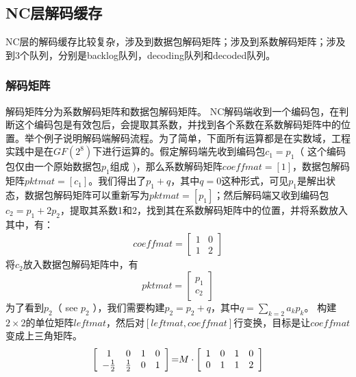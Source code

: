 \subsection{NC层解码缓存}
NC层的解码缓存比较复杂，涉及到数据包解码矩阵；涉及到系数解码矩阵；涉及到3个队列，分别是backlog队列，decoding队列和decoded队列。
\subsubsection{\textbf{解码矩阵}}
解码矩阵分为系数解码矩阵和数据包解码矩阵。
NC解码端收到一个编码包，在判断这个编码包是有效包后，会提取其系数，并找到各个系数在系数解码矩阵中的位置。举个例子说明解码端解码流程。为了简单，下面所有运算都是在实数域，工程实践中是在$GF\left(2^8\right)$下进行运算的。假定解码端先收到编码包$c_{1}=p_{1}$（ 这个编码包仅由一个原始数据包$p_{1}$组成 )，那么系数解码矩阵$coeffmat=\left[1\right]$，数据包解码矩阵$pktmat=\left[c_1\right]$。我们得出了$p_{1}+q$，其中$q=0$这种形式，可见$p_{1}$是解出状态，数据包解码矩阵可以重新写为$pktmat=\left[p_{1}\right]$；然后解码端又收到编码包$c_{2}=p_{1}+2p_{2}$，提取其系数1和2，找到其在系数解码矩阵中的位置，并将系数放入其中，有：
\begin{eqnarray}\label{eq31}
	coeffmat=\left[ {\begin{array}{*{20}{c}}
	1&0\\
	1&2
	\end{array}} \right]
\end{eqnarray}
将$c_{2}$放入数据包解码矩阵中，有
\begin{equation}\label{eq32}
pktmat = \left[ {\begin{array}{*{20}{c}}
	{{p_1}}\\
	{{c_2}}
	\end{array}} \right]
\end{equation}
为了看到$p_{2}$（ see $p_{2}$ ），我们需要构建$p_{2}=p_{2}+q$，其中$q=\sum\limits_{k = 2} {{a_k}{p_k}} $。
构建$2 \times 2$的单位矩阵$leftmat$，然后对$\left[ {leftmat,coeffmat} \right]$行变换，目标是让$coeffmat$变成上三角矩阵。
\begin{eqnarray}\label{eq33}
\left[ {\begin{array}{*{20}{c}}
	1&0&1&0\\
	{{\rm{ - }}\frac{1}{2}}&{\frac{1}{2}}&0&1
	\end{array}} \right]{\rm{ = }}M \cdot \left[ {\begin{array}{*{20}{c}}
	1&0&1&0\\
	0&1&1&2
	\end{array}} \right]
\end{eqnarray}
